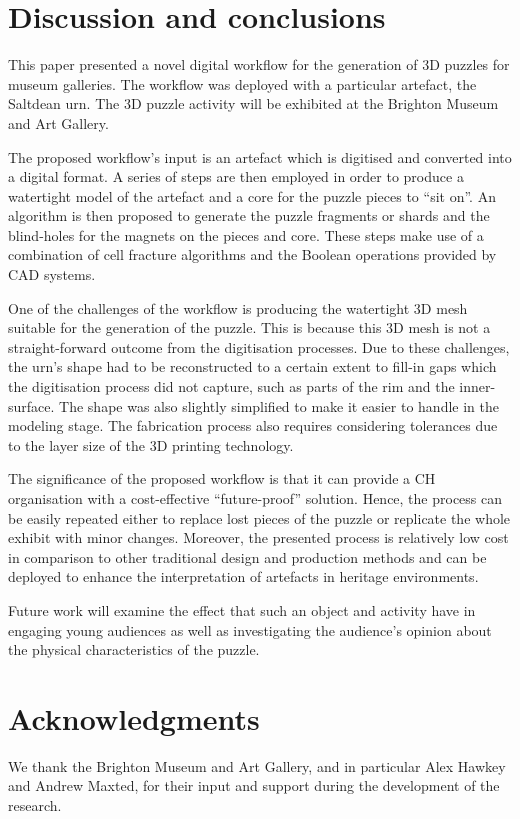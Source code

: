 \documentclass[acmlarge,screen]{acmart}
\begin{document}
\section{Discussion and conclusions}
\label{conclusions}
This paper presented  a novel digital workflow for the generation of 3D puzzles for museum galleries. The workflow was deployed with a particular artefact, the Saltdean urn. The 3D puzzle activity will be exhibited at the Brighton Museum and Art Gallery. 

The proposed workflow's input is an artefact which is digitised and converted into a digital format. A series of steps are then employed in order to produce a watertight model of the artefact and a core for the puzzle pieces to ``sit on''. An algorithm is then proposed to generate the puzzle fragments or shards and the blind-holes for the magnets on the pieces and core. These steps make use of a combination of cell fracture algorithms and the Boolean operations provided by CAD systems.

One of the challenges of the workflow is producing the  watertight 3D mesh suitable for the generation of the puzzle. This is because this 3D mesh is not a straight-forward outcome from the digitisation processes. Due to these challenges, the urn's shape had to be reconstructed to a certain extent to fill-in gaps which the digitisation process did not capture, such as parts of the rim and the inner-surface. The shape was also slightly simplified to make it easier to handle in the modeling stage. The fabrication process also requires considering tolerances due to the layer size of the 3D printing technology.

The significance of the proposed workflow is that it can provide a CH organisation with a cost-effective ``future-proof'' solution. Hence, the process can be easily repeated either to replace lost pieces of the puzzle or replicate the whole exhibit with minor changes. Moreover, the presented process is relatively low cost in comparison to other traditional design and production methods and can be deployed to enhance the interpretation of artefacts in heritage environments.

Future work will examine the effect that such an object and activity have in engaging young audiences as well as investigating the audience's opinion about the physical characteristics of the puzzle.

\section{Acknowledgments}
We thank the Brighton Museum and Art Gallery, and in particular Alex Hawkey and Andrew Maxted, for their input and support during the development of the research. 

%


\end{document}
